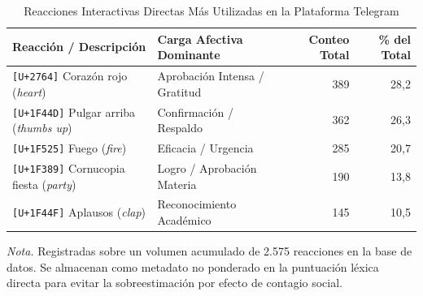 \begin{table}[htbp]
  \centering
  \small
  \caption{Reacciones Interactivas Directas Más Utilizadas en la Plataforma Telegram}
  \label{tab:top_reacciones}
  \begin{tabular}{llrr}
    \toprule
    Reacción / Descripción & Carga Afectiva Dominante & Conteo Total & \% del Total \\
    \midrule
    \texttt{[U+2764]} Corazón rojo (\emph{heart})         & Aprobación Intensa / Gratitud & 389 & 28,2 \\
    \texttt{[U+1F44D]} Pulgar arriba (\emph{thumbs up})   & Confirmación / Respaldo       & 362 & 26,3 \\
    \texttt{[U+1F525]} Fuego (\emph{fire})                & Eficacia / Urgencia           & 285 & 20,7 \\
    \texttt{[U+1F389]} Cornucopia fiesta (\emph{party})   & Logro / Aprobación Materia    & 190 & 13,8 \\
    \texttt{[U+1F44F]} Aplausos (\emph{clap})             & Reconocimiento Académico      & 145 & 10,5 \\
    \bottomrule
  \end{tabular}
  \vspace{4pt}
  \begin{minipage}{0.92\textwidth}
    \footnotesize
    \textit{Nota.} Registradas sobre un volumen acumulado de 2.575 reacciones en la base de datos. Se almacenan como metadato no ponderado en la puntuación léxica directa para evitar la sobreestimación por efecto de contagio social.
  \end{minipage}
\end{table}

